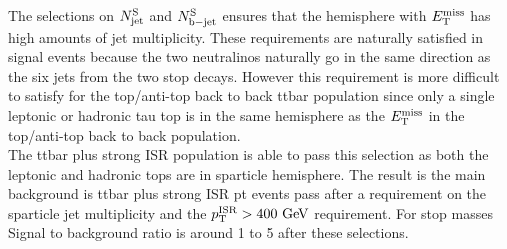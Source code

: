 \indent The selections on $N_{\mathrm{jet}}^{\mathrm{S}}$ and $N_{\mathrm{b-jet}}^{\mathrm{S}}$ ensures that the hemisphere with $E_{\mathrm{T}}^{\mathrm{miss}}$ has high amounts of jet multiplicity.  These requirements are naturally satisfied in signal events because the two neutralinos naturally go in the same direction as the six jets from the two stop decays.  However this requirement is more difficult to satisfy for the top/anti-top back to back ttbar population since only a single leptonic or hadronic tau top is in the same hemisphere as the $E_{\mathrm{T}}^{\mathrm{miss}}$ in the top/anti-top back to back population.  \\

\indent The ttbar plus strong ISR population is able to pass this selection as both the leptonic and hadronic tops are in sparticle hemisphere.  The result is the main background is ttbar plus strong ISR pt events pass after a requirement on the sparticle jet multiplicity and the $\pTISR > 400 \GeV$ requirement.  For stop masses  Signal to background ratio is around 1 to 5 after these selections.  \\



